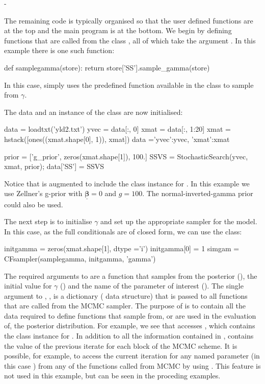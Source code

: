 -\documentclass[article]{jss}
\begin{document}
The remaining code is typically organised so that the user defined
functions are at the top and the main program is at the bottom.  We
begin by defining functions that are called from the class
, all of which take the argument . In this
example there is one such function:

\begin{Code}
def samplegamma(store):
    return store['SS'].sample_gamma(store)
\end{Code}
In this case,  simply uses the predefined function
available in the  class to sample from
$\gamma$. 

The data and an instance of the class  are now
initialised:
\begin{Code}
data = loadtxt('yld2.txt')
yvec = data[:, 0]
xmat = data[:, 1:20]
xmat = hstack([ones((xmat.shape[0], 1)), xmat])
data ={'yvec':yvec, 'xmat':xmat}

prior = ['g_prior', zeros(xmat.shape[1]), 100.]
SSVS = StochasticSearch(yvec, xmat, prior);
data['SS'] = SSVS
\end{Code}


Notice that  is augmented to include the class instance for
.  In this example we use Zellner's g-prior with
$\bm{\underline{\beta}} = 0$ and $g=100$. The normal-inverted-gamma
prior could also be used.

The next step is to initialise $\gamma$ and set up the appropriate
sampler for the model. In this case, as the full conditionals are
of closed form, we can use the  class:

\begin{Code}
initgamma = zeros(xmat.shape[1], dtype ='i')
initgamma[0] = 1
simgam = CFsampler(samplegamma, initgamma, 'gamma')
\end{Code}

The required arguments to  are a function that samples
from the posterior \newline (), the initial value
for $\gamma$ () and the name of the parameter of
interest (). The single argument to ,
, is a dictionary ( data structure) that
is passed to all functions that are called from the MCMC sampler.  The
purpose of  is to contain all the data required to define
functions that sample from, or are used in the evaluation of, the
posterior distribution. For example, we see that 
accesses , which contains the class instance for
. In addition to all the information contained
in ,  contains the value of the previous
iterate for each block of the MCMC scheme. It is possible, for
example, to access the current iteration for any named parameter (in
this case ) from any of the functions called from MCMC
by using . This feature is not used in this
example, but can be seen in the proceding examples.
\end{document}
